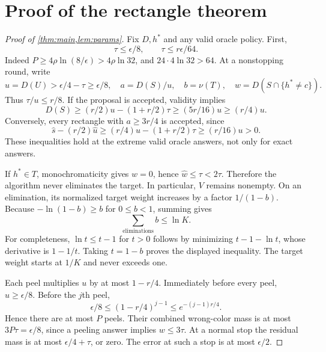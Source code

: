 \section{Proof of the rectangle theorem}\label{proof:main}
\begin{proof}[Proof of \cref{thm:main,lem:params}]
Fix $D,h^*$ and any valid oracle policy. First,
\begin{equation}\label{eq:tau-small}
 \tau\le\epsilon/8,\qquad \tau\le r\epsilon/64.
\end{equation}
Indeed $P\ge4\rho\ln(8/\epsilon)>4\rho\ln32$, and $24\cdot4\ln32>64$. At a nonstopping round, write
\[
 u=D(U)>\epsilon/4-\tau\ge\epsilon/8,
 \quad a=D(S)/u,\quad b=\nu(T),\quad w=D(S\cap\{h^*\ne c\}).
\]
Thus $\tau/u\le r/8$. If the proposal is accepted, validity implies
\[
 D(S)\ge(r/2)u-(1+r/2)\tau\ge(5r/16)u\ge(r/4)u.
\]
Conversely, every rectangle with $a\ge3r/4$ is accepted, since
\[
 \widehat s-(r/2)\widehat u
 \ge(r/4)u-(1+r/2)\tau\ge(r/16)u>0.
\]
These inequalities hold at the extreme valid oracle answers, not only for exact answers.

If $h^*\in T$, monochromaticity gives $w=0$, hence $\widehat w\le\tau<2\tau$. Therefore the algorithm never eliminates the target. In particular, $V$ remains nonempty. On an elimination, its normalized target weight increases by a factor $1/(1-b)$. Because $-\ln(1-b)\ge b$ for $0\le b<1$, summing gives
\begin{equation}\label{eq:elim-budget}
 \sum_{\text{eliminations}} b\le\ln K.
\end{equation}
For completeness, $\ln t\le t-1$ for $t>0$ follows by minimizing $t-1-\ln t$, whose derivative is $1-1/t$. Taking $t=1-b$ proves the displayed inequality. The target weight starts at $1/K$ and never exceeds one.

Each peel multiplies $u$ by at most $1-r/4$. Immediately before every peel, $u\ge\epsilon/8$. Before the $j$th peel,
\[
 \epsilon/8\le(1-r/4)^{j-1}\le e^{-(j-1)r/4}.
\]
Hence there are at most $P$ peels. Their combined wrong-color mass is at most $3P\tau=\epsilon/8$, since a peeling answer implies $w\le3\tau$. At a normal stop the residual mass is at most $\epsilon/4+\tau$, or zero. The error at such a stop is at most $\epsilon/2$.


\end{proof}
